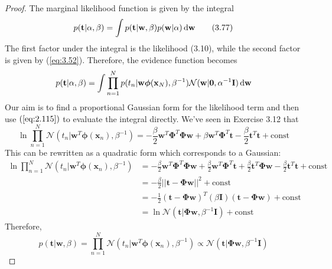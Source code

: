 \begin{proof}
    The marginal likelihood function is given
    by the integral
    \begin{equation*}
        p(\mathbf{t} | \alpha, \beta)
        = \int p(\mathbf{t} | \mathbf{w}, \beta) p(\mathbf{w} | \alpha) \mathop{}\!\mathrm{d} \mathbf{w} 
        \tag{3.77}\label{eq:3.77}
    \end{equation*}
    The first factor under the integral is the likelihood
    (3.10), while the second factor is given
    by (\ref{eq:3.52}). Therefore, the evidence function becomes
    \[
        p(\mathbf{t} | \alpha, \beta) 
        = \int \prod_{n = 1}^N p(t_n | \mathbf{w}\bm{\phi}(\mathbf{x}_N), \beta^{-1}) 
        \mathcal{N}(\mathbf{w} | \mathbf{0}, \alpha^{-1}\mathbf{I}) \mathop{}\!\mathrm{d} \mathbf{w}
    \] 
    Our aim is to find a proportional Gaussian form for the 
    likelihood term and then use $(\ref{eq:2.115})$ to 
    evaluate the integral directly. We've seen in Exercise 3.12
    that 
    \[
        \ln \prod_{n=1}^N \mathcal{N}(t_n | \mathbf{w}^T\bm{\phi}(\mathbf{x}_n), \beta^{-1})
        = -\frac{\beta}{2} \mathbf{w}^T\mathbf{\Phi}^T\mathbf{\Phi}\mathbf{w}
            +\beta \mathbf{w}^T \mathbf{\Phi}^T \mathbf{t} 
            -\frac{\beta}{2} \mathbf{t}^T\mathbf{t}
            + \text{const}
    \]
    This can be rewritten as a quadratic form which corresponds to a Gaussian:
    \begin{align*}
        \ln \prod_{n=1}^N \mathcal{N}(t_n | \mathbf{w}^T\bm{\phi}(\mathbf{x}_n), \beta^{-1})
        &= -\frac{\beta}{2} \mathbf{w}^T\mathbf{\Phi}^T\mathbf{\Phi}\mathbf{w}
            +\frac{\beta}{2}\mathbf{w}^T \mathbf{\Phi}^T \mathbf{t} 
            +\frac{\beta}{2}\mathbf{t}^T \mathbf{\Phi} \mathbf{w} 
            -\frac{\beta}{2} \mathbf{t}^T\mathbf{t}
            + \text{const} \\
        &=  -\frac{\beta}{2} ||\mathbf{t} - \mathbf{\Phi}\mathbf{w}||^2 + \text{const} \\
        &=  -\frac{1}{2} (\mathbf{t} - \mathbf{\Phi}\mathbf{w})^T
            (\beta \mathbf{I})(\mathbf{t} - \mathbf{\Phi}\mathbf{w}) + \text{const} \\
        &= \ln \mathcal{N}(\mathbf{t} | \mathbf{\Phi}\mathbf{w}, \beta^{-1}\mathbf{I})
            + \text{const}
    \end{align*}
    Therefore,
    \[
        p(\mathbf{t} | \mathbf{w}, \beta) 
        = \prod_{n=1}^N \mathcal{N}(t_n | \mathbf{w}^T\bm{\phi}(\mathbf{x}_n), \beta^{-1})
        \propto \mathcal{N}(\mathbf{t} | \mathbf{\Phi}\mathbf{w}, \beta^{-1}\mathbf{I})
\]
\end{proof}
